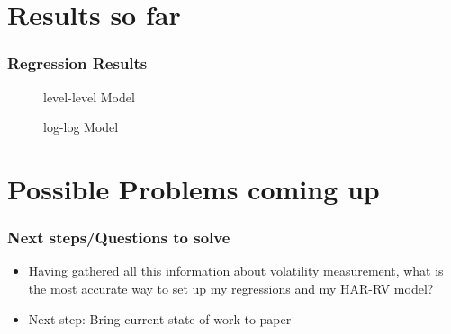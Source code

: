 \documentclass[aspectratio=169]{beamer}
\begin{document}
\section{Results so far}

\begin{frame}
\frametitle{Regression Results}
\begin{scriptsize}
\begin{minipage}{0.45\textwidth}
	\begin{figure}[!htbp]
	\caption{level-level Model}
	\centering
	
	\end{figure}
\end{minipage}
%
\begin{minipage}{0.45\textwidth}
	\begin{figure}[!htbp]
	\caption{log-log Model}
	\centering
	
	\end{figure}
\end{minipage}
\end{scriptsize}
\end{frame}


\section{Possible Problems coming up}

\begin{frame}
\frametitle{Next steps/Questions to solve}
	\begin{itemize}
	\item Having gathered all this information about volatility measurement, what is the most accurate way to set up my regressions and my HAR-RV model?
	\item Next step: Bring current state of work to paper
	\end{itemize}
\end{frame}


\begin{frame}
\printbibliography
\end{frame}
\end{document}

